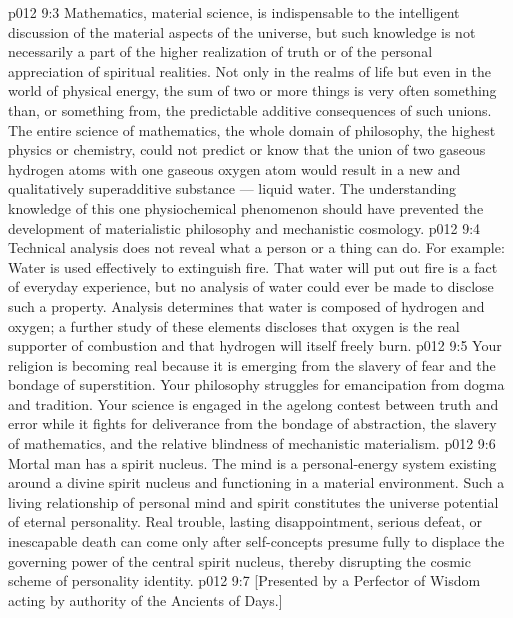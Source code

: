 \vs p012 9:3 Mathematics, material science, is indispensable to the intelligent discussion of the material aspects of the universe, but such knowledge is not necessarily a part of the higher realization of truth or of the personal appreciation of spiritual realities. Not only in the realms of life but even in the world of physical energy, the sum of two or more things is very often something  than, or something  from, the predictable additive consequences of such unions. The entire science of mathematics, the whole domain of philosophy, the highest physics or chemistry, could not predict or know that the union of two gaseous hydrogen atoms with one gaseous oxygen atom would result in a new and qualitatively superadditive substance --- liquid water. The understanding knowledge of this one physiochemical phenomenon should have prevented the development of materialistic philosophy and mechanistic cosmology.
\vs p012 9:4 Technical analysis does not reveal what a person or a thing can do. For example: Water is used effectively to extinguish fire. That water will put out fire is a fact of everyday experience, but no analysis of water could ever be made to disclose such a property. Analysis determines that water is composed of hydrogen and oxygen; a further study of these elements discloses that oxygen is the real supporter of combustion and that hydrogen will itself freely burn.
\vs p012 9:5 Your religion is becoming real because it is emerging from the slavery of fear and the bondage of superstition. Your philosophy struggles for emancipation from dogma and tradition. Your science is engaged in the agelong contest between truth and error while it fights for deliverance from the bondage of abstraction, the slavery of mathematics, and the relative blindness of mechanistic materialism.
\vs p012 9:6 \pc Mortal man has a spirit nucleus. The mind is a personal\hyp{}energy system existing around a divine spirit nucleus and functioning in a material environment. Such a living relationship of personal mind and spirit constitutes the universe potential of eternal personality. Real trouble, lasting disappointment, serious defeat, or inescapable death can come only after self\hyp{}concepts presume fully to displace the governing power of the central spirit nucleus, thereby disrupting the cosmic scheme of personality identity.
\vsetoff
\vs p012 9:7 [Presented by a Perfector of Wisdom acting by authority of the Ancients of Days.]

